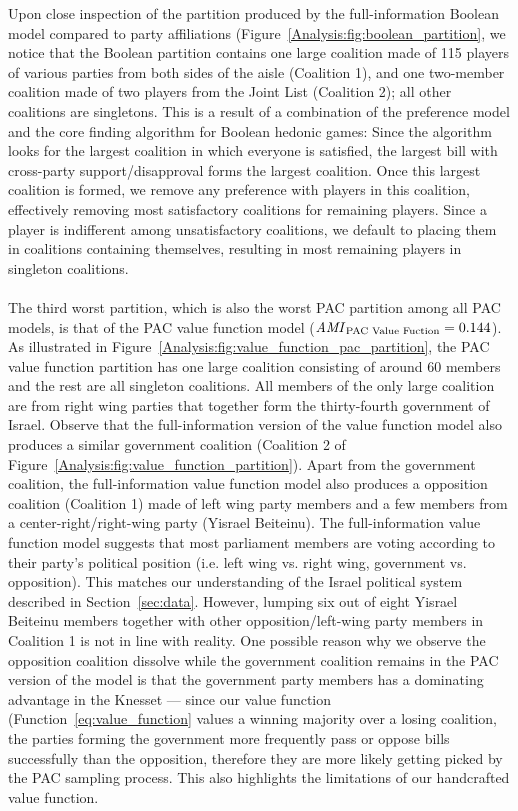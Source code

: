 Upon close inspection of the partition produced by the full-information Boolean
model compared to party affiliations (Figure~\ref{Analysis:fig:boolean_partition},
we notice that the Boolean partition contains one large coalition made of 115
players of various parties from both sides of the aisle (Coalition 1),
and one two-member coalition made of two players from the Joint List (Coalition 2);
all other coalitions are singletons.
This is a result of a combination of the preference model and the core finding
algorithm for Boolean hedonic games:
Since the algorithm looks for the largest coalition in which everyone is
satisfied, the largest bill with cross-party support/disapproval forms the
largest coalition.
Once this largest coalition is formed, we remove any preference with players
in this coalition, effectively removing most satisfactory coalitions for
remaining players.
Since a player is indifferent among unsatisfactory coalitions, we default to
placing them in coalitions containing themselves, resulting in most remaining
players in singleton coalitions.

\paragraph{} The third worst partition, which is also the worst PAC partition
among all PAC models, is that of the PAC value function model
($\mathit{AMI}_{\text{PAC Value Fuction}} = 0.144$).
As illustrated in Figure~\ref{Analysis:fig:value_function_pac_partition}, the
PAC value function partition has one large coalition consisting of around 60
members and the rest are all singleton coalitions.
All members of the only large coalition are from right wing parties that
together form the thirty-fourth government of Israel.
Observe that the full-information version of the value function model also
produces a similar government coalition (Coalition 2 of
Figure~\ref{Analysis:fig:value_function_partition}).
Apart from the government coalition, the full-information value function model
also produces a opposition coalition (Coalition 1) made of left wing party
members and a few members from a center-right/right-wing party
(Yisrael Beiteinu).
The full-information value function model suggests that most parliament members
are voting according to their party's political position (i.e. left wing vs.
right wing, government vs. opposition).
This matches our understanding of the Israel political system described in
Section~\ref{sec:data}.
However, lumping six out of eight Yisrael Beiteinu members together with other
opposition/left-wing party members in Coalition 1 is not in line with reality.
One possible reason why we observe the opposition coalition dissolve while the
government coalition remains in the PAC version of the model is that the
government party members has a dominating advantage in the Knesset --- since our
value function (Function~\ref{eq:value_function} values a winning majority over
a losing coalition, the parties forming the government more frequently pass
or oppose bills successfully than the opposition, therefore they are more
likely getting picked by the PAC sampling process.
This also highlights the limitations of our handcrafted value function.

